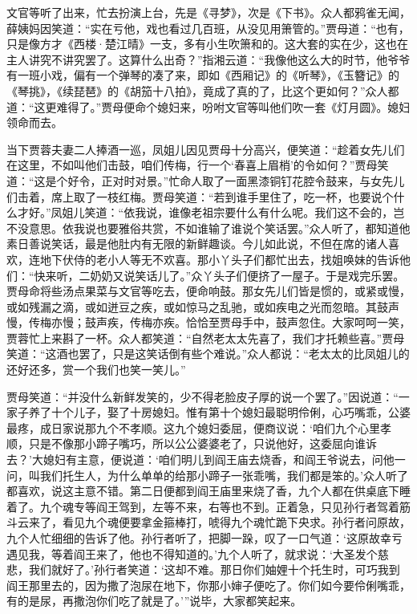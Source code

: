 文官等听了出来，忙去扮演上台，先是《寻梦》，次是《下书》。众人都鸦雀无闻，薛姨妈因笑道：“实在亏他，戏也看过几百班，从没见用箫管的。”贾母道：“也有，只是像方才《西楼·楚江晴》一支，多有小生吹箫和的。这大套的实在少，这也在主人讲究不讲究罢了。这算什么出奇？”指湘云道：“我像他这么大的时节，他爷爷有一班小戏，偏有一个弹琴的凑了来，即如《西厢记》的《听琴》，《玉簪记》的《琴挑》，《续琵琶》的《胡笳十八拍》，竟成了真的了，比这个更如何？”众人都道：“这更难得了。”贾母便命个媳妇来，吩咐文官等叫他们吹一套《灯月圆》。媳妇领命而去。

当下贾蓉夫妻二人捧酒一巡，凤姐儿因见贾母十分高兴，便笑道：“趁着女先儿们在这里，不如叫他们击鼓，咱们传梅，行一个‘春喜上眉梢’的令如何？”贾母笑道：“这是个好令，正对时对景。”忙命人取了一面黑漆铜钉花腔令鼓来，与女先儿们击着，席上取了一枝红梅。贾母笑道：“若到谁手里住了，吃一杯，也要说个什么才好。”凤姐儿笑道：“依我说，谁像老祖宗要什么有什么呢。我们这不会的，岂不没意思。依我说也要雅俗共赏，不如谁输了谁说个笑话罢。”众人听了，都知道他素日善说笑话，最是他肚内有无限的新鲜趣谈。今儿如此说，不但在席的诸人喜欢，连地下伏侍的老小人等无不欢喜。那小丫头子们都忙出去，找姐唤妹的告诉他们：“快来听，二奶奶又说笑话儿了。”众丫头子们便挤了一屋子。于是戏完乐罢。贾母命将些汤点果菜与文官等吃去，便命响鼓。那女先儿们皆是惯的，或紧或慢，或如残漏之滴，或如迸豆之疾，或如惊马之乱驰，或如疾电之光而忽暗。其鼓声慢，传梅亦慢；鼓声疾，传梅亦疾。恰恰至贾母手中，鼓声忽住。大家呵呵一笑，贾蓉忙上来斟了一杯。众人都笑道：“自然老太太先喜了，我们才托赖些喜。”贾母笑道：“这酒也罢了，只是这笑话倒有些个难说。”众人都说：“老太太的比凤姐儿的还好还多，赏一个我们也笑一笑儿。”

贾母笑道：“并没什么新鲜发笑的，少不得老脸皮子厚的说一个罢了。”因说道：“一家子养了十个儿子，娶了十房媳妇。惟有第十个媳妇最聪明伶俐，心巧嘴乖，公婆最疼，成日家说那九个不孝顺。这九个媳妇委屈，便商议说：‘咱们九个心里孝顺，只是不像那小蹄子嘴巧，所以公公婆婆老了，只说他好，这委屈向谁诉去？’大媳妇有主意，便说道：‘咱们明儿到阎王庙去烧香，和阎王爷说去，问他一问，叫我们托生人，为什么单单的给那小蹄子一张乖嘴，我们都是笨的。’众人听了都喜欢，说这主意不错。第二日便都到阎王庙里来烧了香，九个人都在供桌底下睡着了。九个魂专等阎王驾到，左等不来，右等也不到。正着急，只见孙行者驾着筋斗云来了，看见九个魂便要拿金箍棒打，唬得九个魂忙跪下央求。孙行者问原故，九个人忙细细的告诉了他。孙行者听了，把脚一跺，叹了一口气道：‘这原故幸亏遇见我，等着阎王来了，他也不得知道的。’九个人听了，就求说：‘大圣发个慈悲，我们就好了。’孙行者笑道：‘这却不难。那日你们妯娌十个托生时，可巧我到阎王那里去的，因为撒了泡尿在地下，你那小婶子便吃了。你们如今要伶俐嘴乖，有的是尿，再撒泡你们吃了就是了。’”说毕，大家都笑起来。

